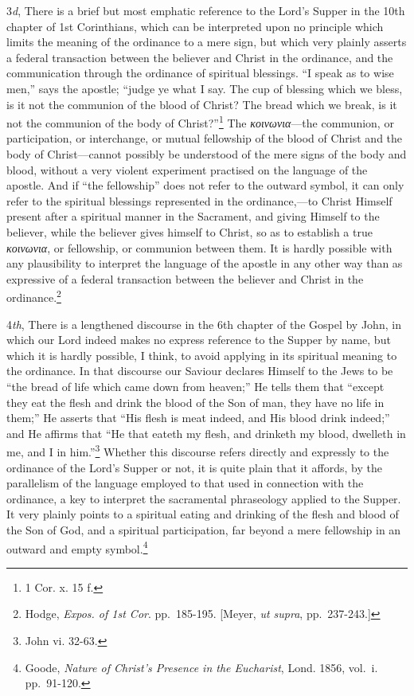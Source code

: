 \documentclass[english,]{book}
\begin{document}
3\emph{d}, There is a brief but most emphatic reference to the Lord's Supper in the 10th chapter of 1st Corinthians, which can be interpreted upon no principle which limits the meaning of the ordinance to a mere sign, but which very plainly asserts a federal transaction between the believer and Christ in the ordinance, and the communication through the ordinance of spiritual blessings. ``I speak as to wise men,'' says the apostle; ``judge ye what I say. The cup of blessing which we bless, is it not the communion of the blood of Christ? The bread which we break, is it not the communion of the body of Christ?''\footnote{1 Cor. x. 15 f.} The \emph{κοινωνια}---the communion, or participation, or interchange, or mutual fellowship of the blood of Christ and the body of Christ---cannot possibly be understood of the mere signs of the body and blood, without a very violent experiment practised on the language of the apostle. And if ``the fellowship'' does not refer to the outward symbol, it can only refer to the spiritual blessings represented in the ordinance,---to Christ Himself present after a spiritual manner in the Sacrament, and giving Himself to the believer, while the believer gives himself to Christ, so as to establish a true \emph{κοινωνια}, or fellowship, or communion between them. It is hardly possible with any plausibility to interpret the language of the apostle in any other way than as expressive of a federal transaction between the believer and Christ in the ordinance.\footnote{Hodge, \emph{Expos. of 1st Cor}. pp.~185-195. {[}Meyer, \emph{ut supra}, pp.~237-243.{]}}

4\emph{th}, There is a lengthened discourse in the 6th chapter of the Gospel by John, in which our Lord indeed makes no express reference to the Supper by name, but which it is hardly possible, I think, to avoid applying in its spiritual meaning to the ordinance. In that discourse our Saviour declares Himself to the Jews to be ``the bread of life which came down from heaven;'' He tells them that ``except they eat the flesh and drink the blood of the Son of man, they have no life in them;'' He asserts that ``His flesh is meat indeed, and His blood drink indeed;'' and He affirms that ``He that eateth my flesh, and drinketh my blood, dwelleth in me, and I in him.''\footnote{John vi. 32-63.} Whether this discourse refers directly and expressly to the ordinance of the Lord's Supper or not, it is quite plain that it affords, by the parallelism of the language employed to that used in connection with the ordinance, a key to interpret the sacramental phraseology applied to the Supper. It very plainly points to a spiritual eating and drinking of the flesh and blood of the Son of God, and a spiritual participation, far beyond a mere fellowship in an outward and empty symbol.\footnote{Goode, \emph{Nature of Christ's Presence in the Eucharist}, Lond. 1856, vol.~i.
  pp.~91-120.}
\end{document}
